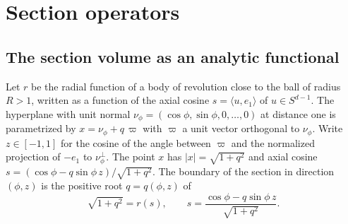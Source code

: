 \documentclass[11pt]{amsart}
\numberwithin{equation}{section}
\theoremstyle{definition}
\theoremstyle{remark}
\newcommand{\abs}[1]{\lvert #1\rvert}
\begin{document}
\section{Section operators}\label{sec:sections}

\subsection{The section volume as an analytic functional}
Let $r$ be the radial function of a body of revolution close to the ball of radius $R>1$, written as a function of the axial cosine $s=\langle u,e_1\rangle$ of $u\in S^{d-1}$. The hyperplane with unit normal $\nu_\phi=(\cos\phi,\sin\phi,0,\dots,0)$ at distance one is parametrized by $x=\nu_\phi+q\,\varpi$ with $\varpi$ a unit vector orthogonal to $\nu_\phi$. Write $z\in[-1,1]$ for the cosine of the angle between $\varpi$ and the normalized projection of $-e_1$ to $\nu_\phi^\perp$. The point $x$ has $\abs x=\sqrt{1+q^2}$ and axial cosine $s=(\cos\phi-q\sin\phi\,z)/\sqrt{1+q^2}$. The boundary of the section in direction $(\phi,z)$ is the positive root $q=q(\phi,z)$ of
\begin{equation}\label{eq:q}
\sqrt{1+q^2}=r(s),\qquad s=\frac{\cos\phi-q\sin\phi\,z}{\sqrt{1+q^2}} .
\end{equation}
\end{document}
